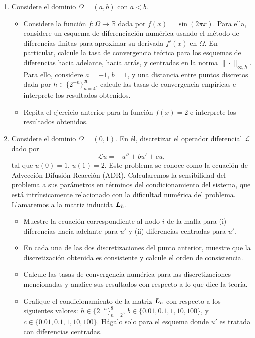 \documentclass{article}
\newcommand{\mat}{\matrixsym}
\newcommand{\R}{\mathbb{R}}
\newcommand{\pts}[1]{[{\bf #1 puntos}]}
\begin{document}
\begin{enumerate}
    \item Considere el dominio $\Omega=(a,b)$ con $a<b$.
            \begin{itemize}
                \item\pts{1} Considere la función $f:\Omega \to \R$ dada por $f(x) = \sin (2\pi x)$. Para ella, considere un esquema de diferenciación numérica usando el método de diferencias finitas para aproximar su derivada $f'(x)$ en $\Omega$. En particular, calcule la tasa de convergencia teórica para los esquemas de diferencias hacia adelante, hacia atrás, y centradas en la norma $\|\cdot \|_{\infty,h}$. Para ello, considere $a=-1$, $b=1$, y una distancia entre puntos discretos dada por $h  \in \{2^{-n}\}_{n=4}^{20}$, calcule las tasas de convergencia empíricas e interprete los resultados obtenidos.
                \item\pts{1} Repita el ejercicio anterior para la función $f(x) = 2$ e interprete los resultados obtenidos.
            \end{itemize}
    \item Considere el dominio $\Omega=(0,1)$. En él, discretizar el operador diferencial $\mathcal L$ dado por
            $$ \mathcal L u = - u'' + bu' + cu, $$
            tal que $u(0) = 1$, $u(1) = 2$. 
            Este problema se conoce como la ecuación de Advección-Difusión-Reacción (ADR).  Calcularemos la sensibilidad del problema a sus parámetros en términos del condicionamiento del sistema, que está intrínsicamente relacionado con la dificultad numérica del problema. Llamaremos a la matriz inducida $\mat L_h$. 
            \begin{itemize}
                \item\pts{1} Muestre la ecuación correspondiente al nodo $i$ de la malla para (i) diferencias hacia adelante para $u'$ y (ii) diferencias centradas para $u'$. 
                \item\pts{2} En cada una de las dos discretizaciones del punto anterior, muestre que la discretización obtenida es consistente y calcule el orden de consistencia.
                \item\pts{2} Calcule las tasas de convergencia numérica para las discretizaciones mencionadas y analice sus resultados con respecto a lo que dice la teoría.
                \item\pts{1} Grafique el condicionamiento de la matriz $\mat L_h$ con respecto a los siguientes valores: $h \in \{2^{-n}\}_{n=2}^8$, $b \in \{0.01,0.1,1,10,100\}$, y $c \in \{0.01,0.1,1,10,100\}$. Hágalo solo para el esquema donde $u'$ es tratada con diferencias centradas.

\end{itemize}
\end{enumerate}
\end{document}
